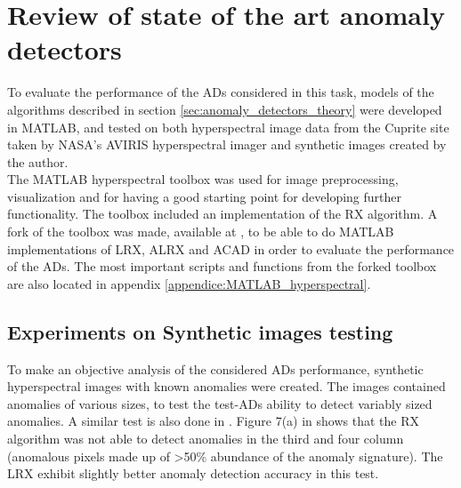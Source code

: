 \newpage 

\chapter{Review of state of the art anomaly detectors}
\label{chapter:review_anomaly_detectors}
To evaluate the performance of the ADs considered in this task, models of the algorithms described in section \ref{sec:anomaly_detectors_theory} were developed in MATLAB, and tested on both hyperspectral image data from the Cuprite site \cite{Cuprite_data} taken by NASA's AVIRIS hyperspectral imager and synthetic images created by the author. 
\\

The MATLAB hyperspectral toolbox \cite{MATLAB_hyperspectral_toolbox} was used for image preprocessing, visualization and for having a good starting point for developing further functionality. The toolbox included an implementation of the RX algorithm. A fork of the toolbox was made, available at \cite{MATLAB_hyperspectral_toolbox_fork}, to be able to do MATLAB implementations of LRX, ALRX and ACAD in order to evaluate the performance of the ADs. The most important scripts and functions from the forked toolbox are also located in appendix \ref{appendice:MATLAB_hyperspectral}.
\section{Experiments on Synthetic images testing}
To make an objective analysis  of the considered ADs performance, synthetic hyperspectral images with known anomalies were created. The images contained anomalies of various sizes, to test the test-ADs ability to detect variably sized anomalies. A similar test is also done in \cite{global_and_local_rx}. Figure 7(a) in \cite{global_and_local_rx} shows that the RX algorithm was not able to detect anomalies in the third and four column (anomalous pixels made up of >50\% abundance of the anomaly signature). The LRX exhibit slightly better anomaly detection accuracy in this test.
\\

